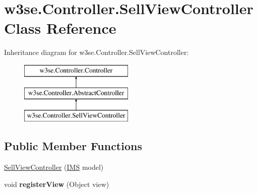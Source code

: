 \hypertarget{classw3se_1_1_controller_1_1_sell_view_controller}{\section{w3se.\-Controller.\-Sell\-View\-Controller Class Reference}
\label{classw3se_1_1_controller_1_1_sell_view_controller}
}
Inheritance diagram for w3se.\-Controller.\-Sell\-View\-Controller\-:\begin{figure}[H]
\begin{center}
\leavevmode
\includegraphics[height=3.000000cm]{classw3se_1_1_controller_1_1_sell_view_controller}
\end{center}
\end{figure}
\subsection*{Public Member Functions}
\begin{DoxyCompactItemize}
\item 
\hyperlink{classw3se_1_1_controller_1_1_sell_view_controller_a01200d08ae63846af9534af090f42405}{Sell\-View\-Controller} (\hyperlink{classw3se_1_1_model_1_1_i_m_s}{I\-M\-S} model)
\item 
\hypertarget{classw3se_1_1_controller_1_1_sell_view_controller_a1565b1095ce21f981521d06e4565d53f}{void {\bfseries register\-View} (Object view)}\label{classw3se_1_1_controller_1_1_sell_view_controller_a1565b1095ce21f981521d06e4565d53f}

\end{DoxyCompactItemize}
